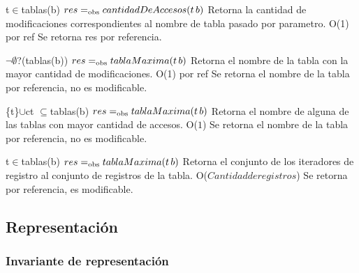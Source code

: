  {t$\in$tablas(b)}
 {$res =_{\mathrm{obs}} cantidadDeAccesos(t\,b)$}
 {Retorna la cantidad de modificaciones correspondientes al nombre de tabla pasado por parametro.}
 {O(1) por ref}
 {Se retorna res por referencia.} 

 {$\neg\emptyset$?(tablas(b))}
 {$res =_{\mathrm{obs}} tablaMaxima(t\,b)$}
 {Retorna el nombre de la tabla con la mayor cantidad de modificaciones.}
 {O(1) por ref}
 {Se retorna el nombre de la tabla por referencia, no es modificable.} 
  
 {\{t\}$\cup$ct $\subseteq$tablas(b)}
 {$res =_{\mathrm{obs}} tablaMaxima(t\,b)$}
 {Retorna el nombre de alguna de las tablas con mayor cantidad de accesos.}
 {O($1$)}
 {Se retorna el nombre de la tabla por referencia, no es modificable.}
  
 {t$\in$tablas(b)}
 {$res =_{\mathrm{obs}} tablaMaxima(t\,b)$}
 {Retorna el conjunto de los iteradores de registro al conjunto de registros de la tabla.}
 {O($Cantidad de registros$)}
 {Se retorna por referencia, es modificable.}
  
 
\newpage
\subsection{Representación}

{
}

\subsubsection*{Invariante de representación}

